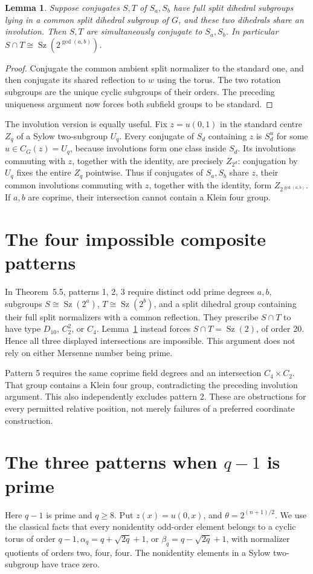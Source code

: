 \documentclass[11pt,a4paper]{article}
\newtheorem{lemma}{Lemma}\newtheorem{theorem}[lemma]{Theorem}
\newcommand{\Sz}{\operatorname{Sz}}\newcommand{\F}{\mathbb F}
\begin{document}
\begin{lemma}\label{split}
Suppose conjugates $S,T$ of $S_a,S_b$ have full split dihedral
subgroups lying in a common split dihedral subgroup of $G$, and these
two dihedrals share an involution. Then $S,T$ are simultaneously conjugate
to $S_a,S_b$. In particular $S\cap T\cong\Sz(2^{\gcd(a,b)})$.
\end{lemma}
\begin{proof}
Conjugate the common ambient split normalizer to the standard one,
and then conjugate its shared reflection to $w$ using the torus.
The two rotation subgroups are the unique cyclic subgroups of their
orders. The preceding uniqueness argument now forces both subfield
groups to be standard.
\end{proof}

The involution version is equally useful. Fix $z=u(0,1)$ in the
standard centre $Z_q$ of a Sylow two-subgroup $U_q$. Every conjugate
of $S_d$ containing $z$ is $S_d^u$ for some $u\in C_G(z)=U_q$,
because involutions form one class inside $S_d$. Its involutions
commuting with $z$, together with the identity, are precisely
$Z_{2^d}$: conjugation by $U_q$ fixes the entire $Z_q$ pointwise.
Thus if conjugates of $S_a,S_b$ share $z$, their common involutions
commuting with $z$, together with the identity, form
$Z_{2^{\gcd(a,b)}}$. If $a,b$ are coprime, their intersection cannot
contain a Klein four group.

\section{The four impossible composite patterns}
In Theorem~5.5, patterns 1, 2, 3 require distinct odd prime degrees $a,b$,
subgroups $S\cong\Sz(2^a)$, $T\cong\Sz(2^b)$, and a split dihedral
group containing their full split normalizers with a common reflection.
They prescribe $S\cap T$ to have type $D_{10}$, $C_2^2$, or $C_4$.
Lemma~\ref{split} instead forces $S\cap T=\Sz(2)$, of order 20.
Hence all three displayed intersections are impossible. This argument
does not rely on either Mersenne number being prime.

Pattern 5 requires the same coprime field degrees and an intersection
$C_4\times C_2$. That group contains a Klein four group, contradicting
the preceding involution argument. This also independently excludes
pattern 2. These are obstructions for every permitted relative position,
not merely failures of a preferred coordinate construction.

\section{The three patterns when \texorpdfstring{$q-1$}{q-1} is prime}
Here $q-1$ is prime and $q\ge8$. Put $z(x)=u(0,x)$, and
$\theta=2^{(n+1)/2}$. We use the classical facts that every nonidentity
odd-order element belongs to a cyclic torus of order
$q-1,\alpha_q=q+\sqrt{2q}+1$, or $\beta_q=q-\sqrt{2q}+1$,
with normalizer quotients of orders two, four, four. The nonidentity
elements in a Sylow two-subgroup have trace zero.
\end{document}
